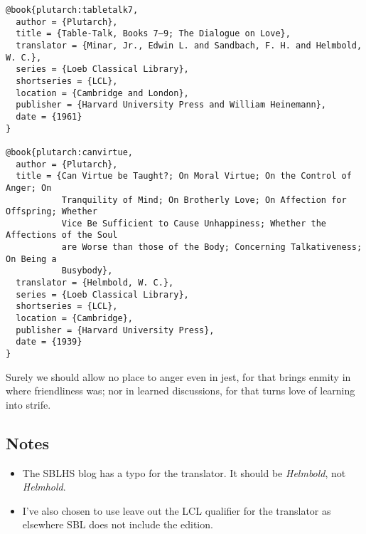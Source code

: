 \documentclass[a4paper]{article}
\begin{document}
\begin{verbatim}
@book{plutarch:tabletalk7,
  author = {Plutarch},
  title = {Table-Talk, Books 7–9; The Dialogue on Love},
  translator = {Minar, Jr., Edwin L. and Sandbach, F. H. and Helmbold, W. C.},
  series = {Loeb Classical Library},
  shortseries = {LCL},
  location = {Cambridge and London},
  publisher = {Harvard University Press and William Heinemann},
  date = {1961}
}

@book{plutarch:canvirtue,
  author = {Plutarch},
  title = {Can Virtue be Taught?; On Moral Virtue; On the Control of Anger; On
           Tranquility of Mind; On Brotherly Love; On Affection for Offspring; Whether
           Vice Be Sufficient to Cause Unhappiness; Whether the Affections of the Soul
           are Worse than those of the Body; Concerning Talkativeness; On Being a
           Busybody},
  translator = {Helmbold, W. C.},
  series = {Loeb Classical Library},
  shortseries = {LCL},
  location = {Cambridge},
  publisher = {Harvard University Press},
  date = {1939}
}
\end{verbatim}

\begin{verbcite}
  Surely we should allow no place to anger even in jest, for that brings
  enmity in where friendliness was; nor in learned discussions, for that turns
  love of learning into strife. 
\end{verbcite}
\exampleancientsources
\examplesecondarysources
\examplebibliography

\subsection{Notes}

\begin{itemize}
  \item The SBLHS blog has a typo for the translator. It should be
    \emph{Helmbold}, not \emph{Helmhold}.
  \item I've also chosen to use leave out the LCL qualifier for the translator
    as elsewhere SBL does not include the edition.
\end{itemize}

\end{document}
